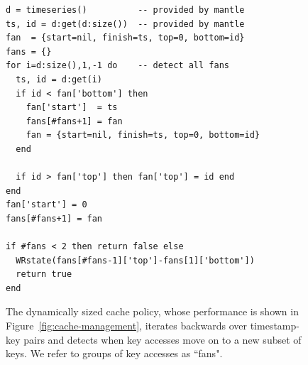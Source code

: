 \begin{figure}[h]
\footnotesize
\begin{verbatim}
d = timeseries()          -- provided by mantle
ts, id = d:get(d:size())  -- provided by mantle
fan  = {start=nil, finish=ts, top=0, bottom=id}
fans = {}
for i=d:size(),1,-1 do    -- detect all fans
  ts, id = d:get(i)
  if id < fan['bottom'] then
    fan['start']  = ts
    fans[#fans+1] = fan 
    fan = {start=nil, finish=ts, top=0, bottom=id}
  end 

  if id > fan['top'] then fan['top'] = id end 
end
fan['start'] = 0 
fans[#fans+1] = fan 

if #fans < 2 then return false else
  WRstate(fans[#fans-1]['top']-fans[1]['bottom'])
  return true
end
\end{verbatim}
\caption{The dynamically sized cache policy, whose performance is shown in 
Figure~\ref{fig:cache-management}, iterates backwards over timestamp-key pairs
and detects when key accesses move on to a new subset of
keys. We refer to groups of key accesses as ``fans".\label{src:dyn-cache}}
\end{figure}
